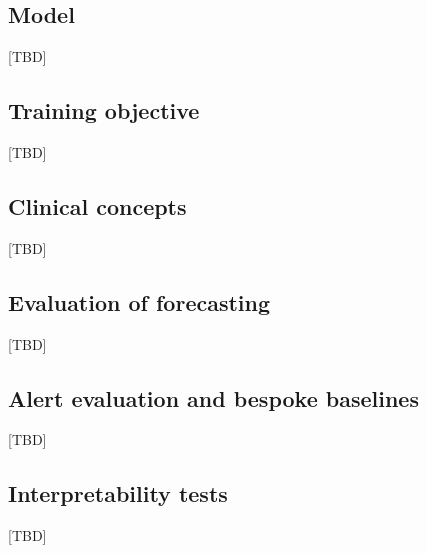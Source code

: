 \documentclass[pdflatex,sn-nature]{sn-jnl}
\begin{document}
\subsection{Model}\label{sec:m-model}
[TBD]

\subsection{Training objective}\label{sec:m-objective}
[TBD]

\subsection{Clinical concepts}\label{sec:m-concepts}
[TBD]

\subsection{Evaluation of forecasting}\label{sec:m-eval-forecast}
[TBD]

\subsection{Alert evaluation and bespoke baselines}\label{sec:m-eval-alerts}
[TBD]

\subsection{Interpretability tests}\label{sec:m-interp}
[TBD]
\end{document}
